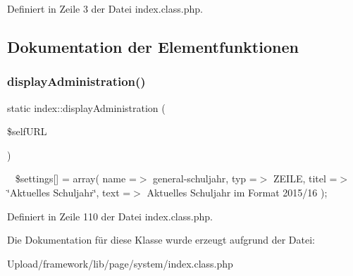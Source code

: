 Definiert in Zeile 3 der Datei index.\+class.\+php.



\subsection{Dokumentation der Elementfunktionen}
\mbox{\label{classindex_a1bcd320add31b44179fb685000187ba6}} 
\subsubsection{\texorpdfstring{display\+Administration()}{displayAdministration()}}
{\footnotesize\ttfamily static index\+::display\+Administration (\begin{DoxyParamCaption}\item[{}]{\$self\+U\+RL }\end{DoxyParamCaption})\hspace{0.3cm}{\ttfamily [static]}}

~\newline
 \$settings\mbox{[}\mbox{]} = array( \textquotesingle{}name\textquotesingle{} =$>$ \textquotesingle{}general-\/schuljahr\textquotesingle{}, \textquotesingle{}typ\textquotesingle{} =$>$ \textquotesingle{}Z\+E\+I\+LE\textquotesingle{}, \textquotesingle{}titel\textquotesingle{} =$>$ \char`\"{}\+Aktuelles Schuljahr\char`\"{}, \textquotesingle{}text\textquotesingle{} =$>$ \textquotesingle{}Aktuelles Schuljahr im Format 2015/16\textquotesingle{} );

Definiert in Zeile 110 der Datei index.\+class.\+php.



Die Dokumentation für diese Klasse wurde erzeugt aufgrund der Datei\+:\begin{DoxyCompactItemize}
\item 
Upload/framework/lib/page/system/index.\+class.\+php\end{DoxyCompactItemize}
